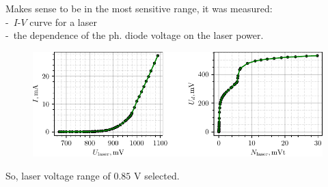 
Makes sense to be in the most sensitive range, it was measured: \\
 -\ $I$-$V$ curve  for a laser \\
 -\ the dependence of the ph. diode voltage on the laser power.

\begin{figure}[h]
    \includegraphics[width=1.0\textwidth]{figures/IV.pdf}
\end{figure}

So, laser voltage range of  $0.85$ V selected.